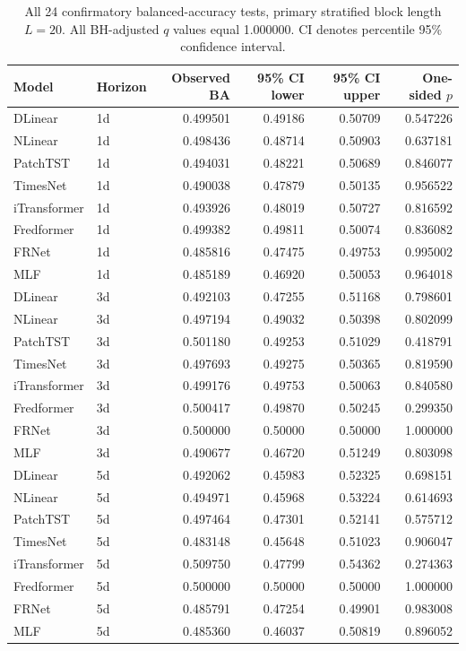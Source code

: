 \documentclass[fleqn,10pt]{wlscirep}
\begin{document}
\begin{table}[htbp]\centering\scriptsize
\caption{All 24 confirmatory balanced-accuracy tests, primary stratified block length $L=20$. All BH-adjusted $q$ values equal 1.000000. CI denotes percentile 95\% confidence interval.}\label{tab:primary_tests}
\begin{tabular}{@{}llrrrr@{}}\toprule
Model & Horizon & Observed BA & 95\% CI lower & 95\% CI upper & One-sided $p$ \\ \midrule
DLinear & 1d & 0.499501 & 0.49186 & 0.50709 & 0.547226 \\
NLinear & 1d & 0.498436 & 0.48714 & 0.50903 & 0.637181 \\
PatchTST & 1d & 0.494031 & 0.48221 & 0.50689 & 0.846077 \\
TimesNet & 1d & 0.490038 & 0.47879 & 0.50135 & 0.956522 \\
iTransformer & 1d & 0.493926 & 0.48019 & 0.50727 & 0.816592 \\
Fredformer & 1d & 0.499382 & 0.49811 & 0.50074 & 0.836082 \\
FRNet & 1d & 0.485816 & 0.47475 & 0.49753 & 0.995002 \\
MLF & 1d & 0.485189 & 0.46920 & 0.50053 & 0.964018 \\
\addlinespace[2pt]
DLinear & 3d & 0.492103 & 0.47255 & 0.51168 & 0.798601 \\
NLinear & 3d & 0.497194 & 0.49032 & 0.50398 & 0.802099 \\
PatchTST & 3d & 0.501180 & 0.49253 & 0.51029 & 0.418791 \\
TimesNet & 3d & 0.497693 & 0.49275 & 0.50365 & 0.819590 \\
iTransformer & 3d & 0.499176 & 0.49753 & 0.50063 & 0.840580 \\
Fredformer & 3d & 0.500417 & 0.49870 & 0.50245 & 0.299350 \\
FRNet & 3d & 0.500000 & 0.50000 & 0.50000 & 1.000000 \\
MLF & 3d & 0.490677 & 0.46720 & 0.51249 & 0.803098 \\
\addlinespace[2pt]
DLinear & 5d & 0.492062 & 0.45983 & 0.52325 & 0.698151 \\
NLinear & 5d & 0.494971 & 0.45968 & 0.53224 & 0.614693 \\
PatchTST & 5d & 0.497464 & 0.47301 & 0.52141 & 0.575712 \\
TimesNet & 5d & 0.483148 & 0.45648 & 0.51023 & 0.906047 \\
iTransformer & 5d & 0.509750 & 0.47799 & 0.54362 & 0.274363 \\
Fredformer & 5d & 0.500000 & 0.50000 & 0.50000 & 1.000000 \\
FRNet & 5d & 0.485791 & 0.47254 & 0.49901 & 0.983008 \\
MLF & 5d & 0.485360 & 0.46037 & 0.50819 & 0.896052 \\
\bottomrule\end{tabular}
\end{table}
\end{document}
